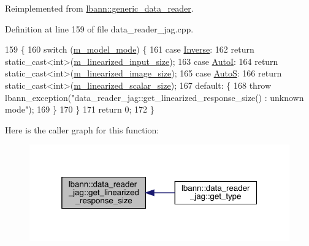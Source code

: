 Reimplemented from \hyperlink{classlbann_1_1generic__data__reader_aacd8704cd11ed6f521cebeaac06c6cb7}{lbann\+::generic\+\_\+data\+\_\+reader}.



Definition at line 159 of file data\+\_\+reader\+\_\+jag.\+cpp.


\begin{DoxyCode}
159                                                         \{
160   \textcolor{keywordflow}{switch} (\hyperlink{classlbann_1_1data__reader__jag_a877eb1f0eb2afccd73cd7d69407ff6e2}{m\_model\_mode}) \{
161     \textcolor{keywordflow}{case} \hyperlink{classlbann_1_1data__reader__jag_a114c369c8604df385cf7a3ec20c9739ba2d3bba9f202270762169c1c01d2fb7a4}{Inverse}:
162       \textcolor{keywordflow}{return} \textcolor{keyword}{static\_cast<}\textcolor{keywordtype}{int}\textcolor{keyword}{>}(\hyperlink{classlbann_1_1data__reader__jag_a75e3c8870f9fc8e50fb24e4515ac7d82}{m\_linearized\_input\_size});
163     \textcolor{keywordflow}{case} \hyperlink{classlbann_1_1data__reader__jag_a114c369c8604df385cf7a3ec20c9739bae9c49fc4443020e18086fc83ce0b369b}{AutoI}:
164       \textcolor{keywordflow}{return} \textcolor{keyword}{static\_cast<}\textcolor{keywordtype}{int}\textcolor{keyword}{>}(\hyperlink{classlbann_1_1data__reader__jag_a7c2aa5f489e7c7a3236c1f6c4a760048}{m\_linearized\_image\_size});
165     \textcolor{keywordflow}{case} \hyperlink{classlbann_1_1data__reader__jag_a114c369c8604df385cf7a3ec20c9739baab2b8e8bef02dfc8ffaae80bdd0a7fd4}{AutoS}:
166       \textcolor{keywordflow}{return} \textcolor{keyword}{static\_cast<}\textcolor{keywordtype}{int}\textcolor{keyword}{>}(\hyperlink{classlbann_1_1data__reader__jag_a856b4b9cdf9d8569e5fef1d5d996870d}{m\_linearized\_scalar\_size});
167     \textcolor{keywordflow}{default}: \{
168       \textcolor{keywordflow}{throw} lbann\_exception(\textcolor{stringliteral}{"data\_reader\_jag::get\_linearized\_response\_size() : unknown mode"});
169     \}
170   \}
171   \textcolor{keywordflow}{return} 0;
172 \}
\end{DoxyCode}
Here is the caller graph for this function\+:\nopagebreak
\begin{figure}[H]
\begin{center}
\leavevmode
\includegraphics[width=319pt]{classlbann_1_1data__reader__jag_ad8e4752ead359374c9c7c10becf6aec1_icgraph}
\end{center}
\end{figure}
